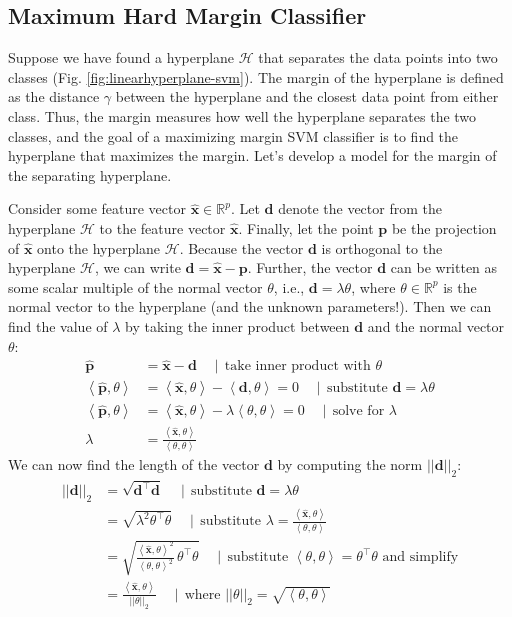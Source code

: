 \documentclass{article}[11pt]
\def\R{\mathbb{R}}
\newcommand{\norm}[1]{\left|\left|#1\right|\right|}
\begin{document}
\subsection{Maximum Hard Margin Classifier}\label{sec:max-margin}
Suppose we have found a hyperplane $\mathcal{H}$ that separates the data points into two classes (Fig. \ref{fig:linearhyperplane-svm}).
The margin of the hyperplane is defined as the distance $\gamma$ between the hyperplane and the closest data point from either class.
Thus, the margin measures how well the hyperplane separates the two classes, and the goal of a maximizing margin SVM classifier is to find the hyperplane that maximizes the margin.
Let's develop a model for the margin of the separating hyperplane.

Consider some feature vector $\hat{\mathbf{x}} \in \R^{p}$. Let $\mathbf{d}$ denote the vector from the hyperplane $\mathcal{H}$ to the feature vector $\hat{\mathbf{x}}$.
Finally, let the point $\mathbf{p}$ be the projection of $\hat{\mathbf{x}}$ onto the hyperplane $\mathcal{H}$.
Because the vector $\mathbf{d}$ is orthogonal to the hyperplane $\mathcal{H}$, we can write $\mathbf{d} = \hat{\mathbf{x}} - \mathbf{p}$.
Further, the vector $\mathbf{d}$ can be written as some scalar multiple of the normal vector $\theta$, i.e., $\mathbf{d} = \lambda \theta$, 
where $\theta\in\R^{p}$ is the normal vector to the hyperplane (and the unknown parameters!).
Then we can find the value of $\lambda$ by taking the inner product between $\mathbf{d}$ and the normal vector $\theta$:
\begin{align*}
    \hat{\mathbf{p}} & = \hat{\mathbf{x}} - \mathbf{d}\quad\mid\,\text{take inner product with $\theta$} \\
    \left<\hat{\mathbf{p}},\theta\right> & = \left<\hat{\mathbf{x}},\theta\right> - \left<\mathbf{d},\theta\right> = 0\quad\mid\,\text{substitute $\mathbf{d} = \lambda \theta$} \\
    \left<\hat{\mathbf{p}},\theta\right> & = \left<\hat{\mathbf{x}},\theta\right> - \lambda \left<\theta,\theta\right> = 0\quad\mid\,\text{solve for $\lambda$} \\
    \lambda & = \frac{\left<\hat{\mathbf{x}},\theta\right>}{\left<\theta,\theta\right>}
\end{align*}
We can now find the length of the vector $\mathbf{d}$ by computing the norm $\norm{\mathbf{d}}_{2}$:
\begin{align*}
    \norm{\mathbf{d}}_{2} & = \sqrt{\mathbf{d}^{\top}\mathbf{d}}\quad\mid\,\text{substitute $\mathbf{d} = \lambda \theta$} \\
    & = \sqrt{\lambda^{2}\theta^{\top}\theta}\quad\mid\,\text{substitute $\lambda = \frac{\left<\hat{\mathbf{x}},\theta\right>}{\left<\theta,\theta\right>}$} \\
    & = \sqrt{\frac{\left<\hat{\mathbf{x}},\theta\right>^{2}}{\left<\theta,\theta\right>^{2}}\,\theta^{\top}\theta}\quad\mid\, \text{substitute $\left<\theta,\theta\right> = \theta^{\top}\theta$ and simplify} \\
    & = \frac{\left<\hat{\mathbf{x}},\theta\right>}{\norm{\theta}_{2}}\quad\mid\,\text{where $\norm{\theta}_{2} = \sqrt{\left<\theta,\theta\right>}$}
\end{align*}
\end{document}
